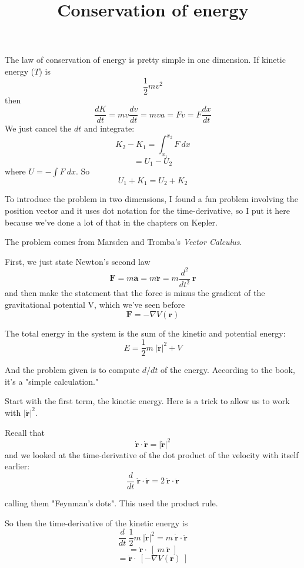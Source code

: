 \documentclass[11pt, oneside]{article}
\title{Conservation of energy}
\date{}
\begin{document}
\maketitle
\Large


The law of conservation of energy is pretty simple in one dimension.  If kinetic energy ($T$) is 
\[ \frac{1}{2} mv^2 \]
then
\[ \frac{dK}{dt} = mv \frac{dv}{dt} = mva = Fv = F \frac{dx}{dt} \]
We just cancel the $dt$ and integrate:
\[ K_{2} - K_{1}  = \int_{x_1}^{x_2} F \ dx \]
\[ = U_1 - U_2 \]
where $U = - \int F \ dx$.  So
\[ U_1 + K_1 = U_2 + K_2 \]
 
To introduce the problem in two dimensions, I found a fun problem involving  the position vector and it uses dot notation for the time-derivative, so I put it here because we've done a lot of that in the chapters on Kepler.

The problem comes from Marsden and Tromba's \emph{Vector Calculus}.

First, we just state Newton's second law
\[ \mathbf{F} = m \mathbf{a} = m \mathbf{\ddot{r}} = m \frac{d^2}{dt^2} \ \mathbf{r} \]
and then make the statement that the force is minus the gradient of the gravitational potential V, which we've seen before
\[ \mathbf{F} = - \nabla V(\mathbf{r}) \]

The total energy in the system is the sum of the kinetic and potential energy:
\[ E = \frac{1}{2} m\ |\mathbf{\dot{r}}|^2 + V \]

And the problem given is to compute $d/dt$ of the energy.  According to the book, it's a "simple calculation."

Start with the first term, the kinetic energy.  Here is a trick to allow us to work with  $|\mathbf{\dot{r}}|^2$.  

Recall that
\[ \mathbf{\dot{r}} \cdot  \mathbf{\dot{r}}  = |\mathbf{\dot{r}}|^2 \]
and we looked at the time-derivative of the dot product of the velocity with itself earlier:
\[ \frac{d}{dt} \  \mathbf{\dot{r}} \cdot  \mathbf{\dot{r}} = 2\  \mathbf{\dot{r}} \cdot  \mathbf{\ddot{r}} \]

calling them "Feynman's dots".  This used the product rule. 

So then the time-derivative of the kinetic energy is
\[ \frac{d}{dt} \ \frac{1}{2} m\ |\mathbf{\dot{r}}|^2 = m\ \mathbf{\dot{r}} \cdot  \mathbf{\ddot{r}} \]
\[ = \mathbf{\dot{r}} \cdot \ [ \ m \ \mathbf{\ddot{r}} \ ] \]
\[ = \mathbf{\dot{r}} \cdot \ [ - \nabla V(\mathbf{r}) \  ] \]
\end{document}
